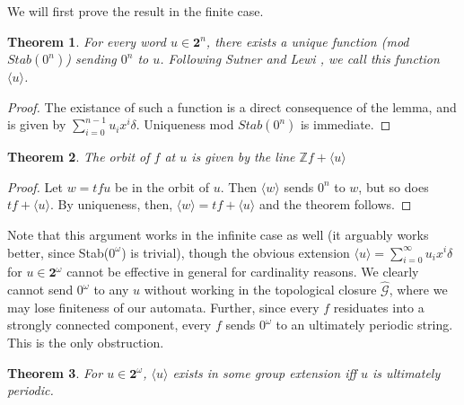 \documentclass{article}
\newcommand{\G}{\mathcal{G}}
\newcommand{\Z}{\mathbb{Z}}
\newcommand{\2}{\textbf{2}}
\newtheorem{thm}{Theorem}
\theoremstyle{definition}
\begin{document}
We will first prove the result in the finite case.

\begin{thm}
  For every word $u \in \2^n$, there exists a unique function
  (mod $Stab(0^n)$) sending $0^n$ to $u$. Following Sutner and Lewi
  \cite{SutnerLewi12:iter_inver_bin_trans}, we call this function
  $\langle u \rangle$.
\end{thm}

\begin{proof}
  The existance of such a function is a direct consequence of the lemma,
  and is given by $\sum_{i=0}^{n-1} u_i x^i \delta$.
  Uniqueness mod $Stab(0^n)$ is immediate.
\end{proof}

\begin{thm}
  The orbit of $f$ at $u$ is given by the line $\Z f + \langle u \rangle$
\end{thm}

\begin{proof}
  Let $w = tf u$ be in the orbit of $u$. Then $\langle w \rangle$ sends 
  $0^n$ to $w$, but so does $tf + \langle u \rangle$. By uniqueness, then,
  $\langle w \rangle = tf + \langle u \rangle$ and the theorem follows.
\end{proof}

Note that this argument works in the infinite case as well 
(it arguably works better, since Stab($0^\omega$) is trivial), though
the obvious extension $\langle u \rangle = \sum_{i=0}^{\infty} u_i x^i \delta$ 
for $u \in \2^\omega$ cannot be effective in general for cardinality reasons. 
We clearly cannot send $0^\omega$ to any $u$ without working in the 
topological closure $\widehat{\G}$, where we may lose finiteness of our 
automata. Further, since every $f$ residuates into a strongly connected 
component, every $f$ sends $0^\omega$ to an ultimately periodic string.
This is the only obstruction.

\begin{thm}
  For $u \in \2^\omega$, $\langle u \rangle$ exists in some group extension
  iff $u$ is ultimately periodic.
\end{thm}
\end{document}
